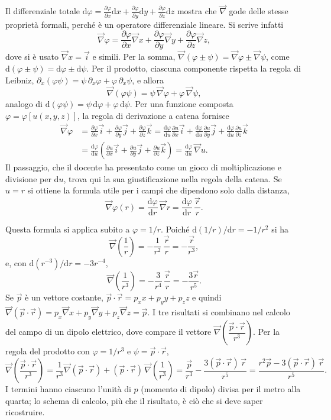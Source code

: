 \documentclass[11pt,a4paper]{article}
\newcommand{\nab}{\vec{\nabla}}
\newcommand{\dd}{\mathrm{d}}
\begin{document}
Il differenziale totale $\dd\varphi=\frac{\partial\varphi}{\partial x}\dd x+\frac{\partial\varphi}{\partial y}\dd y+\frac{\partial\varphi}{\partial z}\dd z$ mostra che $\nab$ gode delle stesse proprietà formali, perché è un operatore differenziale lineare. Si scrive infatti
\[
\nab\varphi=\frac{\partial\varphi}{\partial x}\nab x+\frac{\partial\varphi}{\partial y}\nab y+\frac{\partial\varphi}{\partial z}\nab z ,
\]
dove si è usato $\nab x=\vec i$ e simili. Per la somma, $\nab(\varphi\pm\psi)=\nab\varphi\pm\nab\psi$, come $\dd(\varphi\pm\psi)=\dd\varphi\pm\dd\psi$. Per il prodotto, ciascuna componente rispetta la regola di Leibniz, $\partial_x(\varphi\psi)=\psi\,\partial_x\varphi+\varphi\,\partial_x\psi$, e allora
\[
\nab(\varphi\psi)=\psi\,\nab\varphi+\varphi\,\nab\psi ,
\]
analogo di $\dd(\varphi\psi)=\psi\,\dd\varphi+\varphi\,\dd\psi$. Per una funzione composta $\varphi=\varphi[u(x,y,z)]$, la regola di derivazione a catena fornisce
\begin{align*}
\nab\varphi&=\frac{\partial\varphi}{\partial x}\vec i+\frac{\partial\varphi}{\partial y}\vec j+\frac{\partial\varphi}{\partial z}\vec k
=\frac{\dd\varphi}{\dd u}\frac{\partial u}{\partial x}\vec i+\frac{\dd\varphi}{\dd u}\frac{\partial u}{\partial y}\vec j+\frac{\dd\varphi}{\dd u}\frac{\partial u}{\partial z}\vec k\\
&=\frac{\dd\varphi}{\dd u}\left(\frac{\partial u}{\partial x}\vec i+\frac{\partial u}{\partial y}\vec j+\frac{\partial u}{\partial z}\vec k\right)=\frac{\dd\varphi}{\dd u}\,\nab u .
\end{align*}
Il passaggio, che il docente ha presentato come un gioco di moltiplicazione e divisione per $\dd u$, trova qui la sua giustificazione nella regola della catena. Se $u=r$ si ottiene la formula utile per i campi che dipendono solo dalla distanza,
\[
\nab\varphi(r)=\frac{\dd\varphi}{\dd r}\,\nab r=\frac{\dd\varphi}{\dd r}\,\frac{\vec r}{r}.
\]

Questa formula si applica subito a $\varphi=1/r$. Poiché $\dd(1/r)/\dd r=-1/r^2$ si ha
\[
\nab\!\left(\frac1r\right)=-\frac1{r^2}\,\frac{\vec r}{r}=-\frac{\vec r}{r^3},
\]
e, con $\dd(r^{-3})/\dd r=-3r^{-4}$,
\[
\nab\!\left(\frac1{r^3}\right)=-\frac{3}{r^4}\,\frac{\vec r}{r}=-\frac{3\vec r}{r^5}.
\]
Se $\vec p$ è un vettore costante, $\vec p\cdot\vec r=p_xx+p_yy+p_zz$ e quindi $\nab(\vec p\cdot\vec r)=p_x\nab x+p_y\nab y+p_z\nab z=\vec p$. I tre risultati si combinano nel calcolo del campo di un dipolo elettrico, dove compare il vettore $\nab\!\left(\dfrac{\vec p\cdot\vec r}{r^3}\right)$. Per la regola del prodotto con $\varphi=1/r^3$ e $\psi=\vec p\cdot\vec r$,
\[
\nab\!\left(\frac{\vec p\cdot\vec r}{r^3}\right)=\frac1{r^3}\nab(\vec p\cdot\vec r)+(\vec p\cdot\vec r)\,\nab\!\left(\frac1{r^3}\right)
=\frac{\vec p}{r^3}-\frac{3(\vec p\cdot\vec r)\,\vec r}{r^5}=\frac{r^2\vec p-3(\vec p\cdot\vec r)\,\vec r}{r^5}.
\]
I termini hanno ciascuno l'unità di $p$ (momento di dipolo) divisa per il metro alla quarta; lo schema di calcolo, più che il risultato, è ciò che si deve saper ricostruire.
\end{document}
